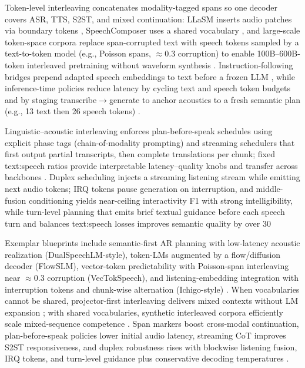 \documentclass{article}
\begin{document}
Token-level interleaving concatenates modality-tagged spans so one decoder covers ASR, TTS, S2ST, and mixed continuation: LLaSM inserts audio patches via boundary tokens \cite{shu2023llasmlargelanguagespeechmodel}, SpeechComposer uses a shared vocabulary \cite{wu2024speechcomposerunifyingmultiplespeechtask}, and large-scale token-space corpora replace span-corrupted text with speech tokens sampled by a text-to-token model (e.g., Poisson spans, $\approx$0.3 corruption) to enable 100B--600B-token interleaved pretraining without waveform synthesis \cite{zeng2024scalingspeechtextpretrainingsyntheticint}. Instruction-following bridges prepend adapted speech embeddings to text before a frozen LLM \cite{wang2023slmbridgethingapbetweenspeechtextfoundat}, while inference-time policies reduce latency by cycling text and speech token budgets and by staging transcribe$\rightarrow$generate to anchor acoustics to a fresh semantic plan (e.g., 13 text then 26 speech tokens) \cite{zeng2024glm4voicetowardsintelligenthumanlikeends}.

Linguistic--acoustic interleaving enforces plan-before-speak schedules using explicit phase tags (chain-of-modality prompting) and streaming schedulers that first output partial transcripts, then complete translations per chunk; fixed text:speech ratios provide interpretable latency--quality knobs and transfer across backbones \cite{zeng2024scalingspeechtextpretrainingsyntheticint,guo2025streamuniachievingstreamingspeechtransla,zeng2024glm4voicetowardsintelligenthumanlikeends}. Duplex scheduling injects a streaming listening stream while emitting next audio tokens; IRQ tokens pause generation on interruption, and middle-fusion conditioning yields near-ceiling interactivity F1 with strong intelligibility, while turn-level planning that emits brief textual guidance before each speech turn and balances text:speech losses improves semantic quality by over 30%

Exemplar blueprints include semantic-first AR planning with low-latency acoustic realization (DualSpeechLM-style), token-LMs augmented by a flow/diffusion decoder (FlowSLM), vector-token predictability with Poisson-span interleaving near $\approx$0.3 corruption (VecTokSpeech), and listening-embedding integration with interruption tokens and chunk-wise alternation (Ichigo-style) \cite{zeng2024scalingspeechtextpretrainingsyntheticint}. When vocabularies cannot be shared, projector-first interleaving delivers mixed contexts without LM expansion \cite{wang2023slmbridgethingapbetweenspeechtextfoundat}; with shared vocabularies, synthetic interleaved corpora efficiently scale mixed-sequence competence \cite{zeng2024scalingspeechtextpretrainingsyntheticint}. Span markers boost cross-modal continuation, plan-before-speak policies lower initial audio latency, streaming CoT improves S2ST responsiveness, and duplex robustness rises with blockwise listening fusion, IRQ tokens, and turn-level guidance plus conservative decoding temperatures \cite{zeng2024glm4voicetowardsintelligenthumanlikeends,guo2025streamuniachievingstreamingspeechtransla,ma2024languagemodelcanlistenwhilespeaking,cui2025thinkbeforeyoutalkenhancingmeaningfuldia}.

\end{document}
